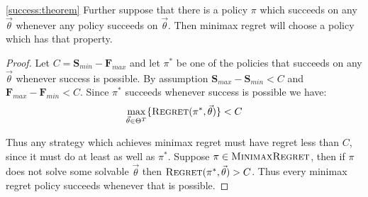 \documentclass{article}
\begin{document}
\begin{appendix}
\begin{customthm}{\ref{success:theorem}}
 Further suppose that there is a policy $\pi$ which succeeds on any $\vec{\theta}$ whenever any policy succeeds on $\vec{\theta}$. Then minimax regret will choose a policy which has that property.
\end{customthm}
\begin{proof}
     Let $C = \textbf{S}_{min} - \textbf{F}_{max}$ and let $\pi^*$ be one of the policies that succeeds on any $\vec{\theta}$ whenever success is possible.  By assumption $\textbf{S}_{max} - \textbf{S}_{min} < C$ and $ \textbf{F}_{max} - \textbf{F}_{min} < C$.  Since $\pi^*$ succeeds whenever success is possible we have:
     \[
     \max\limits_{\vec{\theta}\in \Theta^T}\{\normalfont\textsc{Regret}(\pi^* ,\vec{\theta})\} < C
     \]
    
     Thus any strategy which achieves minimax regret must have regret less than $C$, since it must do at least as well as $\pi^*$.  Suppose $\pi \in \normalfont\textsc{MinimaxRegret}$, then if $\pi$ does not solve some solvable $\vec{\theta}$ then $\normalfont\textsc{Regret}(\pi^*,\vec{\theta}) > C$.  Thus every minimax regret policy succeeds whenever that is possible.
\end{proof}


\end{appendix}
\end{document}
